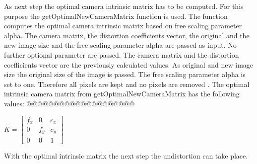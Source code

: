 \documentclass[twocolumn,10pt]{asme2ej}
\begin{document}
As next step the optimal camera intrinsic matrix has to be computed. For this purpose the getOptimalNewCameraMatrix function\cite{opencv_getOptimalNewCameraMatrix} is used. The function computes the optimal camera intrinsic matrix based on free scaling parameter alpha.
The camera matrix, the distortion coefficients vector, the original and the new image size and the free scaling parameter alpha are passed as input. No further optional parameter are passed. The camera matrix and the distortion coefficients vector are the previously calculated values. As original and new image size the original size of the image is passed. The free scaling parameter alpha is set to one. Therefore all pixels are kept and no pixels are removed \cite{opencv_calibrationtutorial}.
The optimal intrinsic camera matrix from getOptimalNewCameraMatrix has the following values:
@@@@@@@@@@@@@@@@@@@@
\begin{center}
    $K = \begin{bmatrix}
   f_x & 0 & c_x \\
   0 & f_y & c_y \\
   0 & 0 & 1
   \end{bmatrix}
   $
    \label{eq_optintrinsicmatrix}
\end{center}
With the optimal intrinsic matrix the next step the undistortion can take place.









\end{document}
